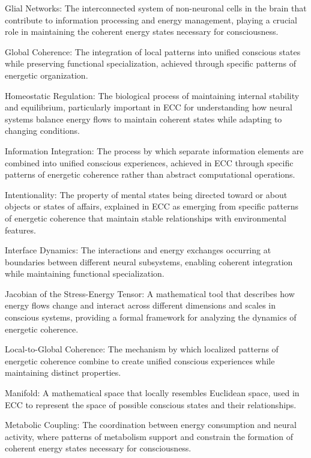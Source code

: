 Glial Networks: The interconnected system of non-neuronal cells in the brain that contribute to information processing and energy management, playing a crucial role in maintaining the coherent energy states necessary for consciousness.

Global Coherence: The integration of local patterns into unified conscious states while preserving functional specialization, achieved through specific patterns of energetic organization.

Homeostatic Regulation: The biological process of maintaining internal stability and equilibrium, particularly important in ECC for understanding how neural systems balance energy flows to maintain coherent states while adapting to changing conditions.

Information Integration: The process by which separate information elements are combined into unified conscious experiences, achieved in ECC through specific patterns of energetic coherence rather than abstract computational operations.

Intentionality: The property of mental states being directed toward or about objects or states of affairs, explained in ECC as emerging from specific patterns of energetic coherence that maintain stable relationships with environmental features.

Interface Dynamics: The interactions and energy exchanges occurring at boundaries between different neural subsystems, enabling coherent integration while maintaining functional specialization.

Jacobian of the Stress-Energy Tensor: A mathematical tool that describes how energy flows change and interact across different dimensions and scales in conscious systems, providing a formal framework for analyzing the dynamics of energetic coherence.

Local-to-Global Coherence: The mechanism by which localized patterns of energetic coherence combine to create unified conscious experiences while maintaining distinct properties.

Manifold: A mathematical space that locally resembles Euclidean space, used in ECC to represent the space of possible conscious states and their relationships.

Metabolic Coupling: The coordination between energy consumption and neural activity, where patterns of metabolism support and constrain the formation of coherent energy states necessary for consciousness.

